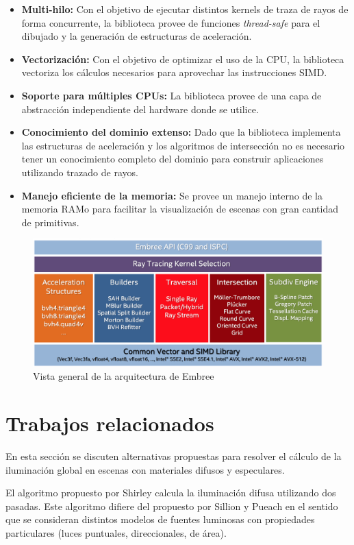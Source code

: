 \begin{itemize}
	\item \textbf{Multi-hilo:} Con el objetivo de ejecutar distintos kernels de traza de rayos de forma concurrente, la biblioteca provee de funciones \textit{thread-safe} para el dibujado y la generación de estructuras de aceleración.
	\item \textbf{Vectorización:} Con el objetivo de optimizar el uso de la CPU, la biblioteca vectoriza los cálculos necesarios para aprovechar las instrucciones SIMD.
	\item \textbf{Soporte para múltiples CPUs:} La biblioteca provee de una capa de abstracción independiente del hardware donde se utilice.
	\item \textbf{Conocimiento del dominio extenso:} Dado que la biblioteca implementa las estructuras de aceleración y los algoritmos de intersección no es necesario tener un conocimiento completo del dominio para construir aplicaciones utilizando trazado de rayos.
	\item \textbf{Manejo eficiente de la memoria:} Se provee un manejo interno de la memoria RAMo para facilitar la visualización de escenas con gran cantidad de primitivas.
\end{itemize}

\vspace{5mm}
\begin{figure}[H]
	\centering
	\includegraphics[width=.8\linewidth]{assets/embree}
	\caption{Vista general de la arquitectura de Embree}
	\label{img:embree}
\end{figure}

\section{Trabajos relacionados}

En esta sección se discuten alternativas propuestas para resolver el cálculo de la iluminación global en escenas con materiales difusos y especulares.

El algoritmo propuesto por Shirley \cite{Shirley} calcula la iluminación difusa utilizando dos pasadas. Este algoritmo difiere del propuesto por Sillion y Pueach \cite{Sillion} en el sentido que se consideran distintos modelos de fuentes luminosas con propiedades particulares (luces puntuales, direccionales, de área).

